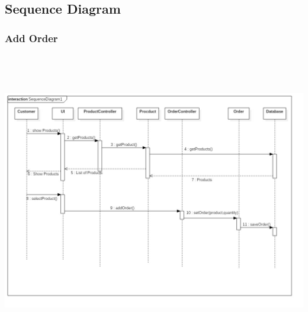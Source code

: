 \documentclass[12pt]{article}
\begin{document}
\subsection{ Sequence Diagram }

\subsubsection{ Add Order }
\begin{center}
	\includegraphics[width=17cm,height=13cm]{./assets/sequencediagram/addorder.png}\\
\end{center}
\end{document}
